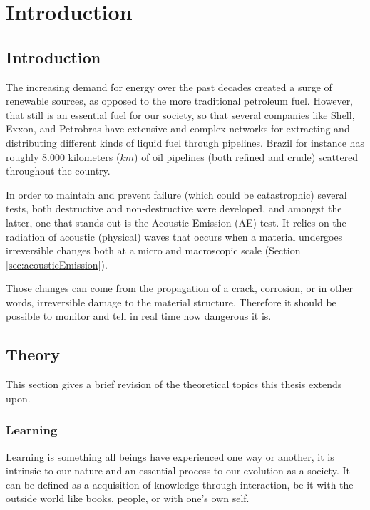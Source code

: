 \chapter{Introduction}

\section{Introduction}
The increasing demand for energy over the past decades created a surge of renewable sources, as opposed to the more traditional petroleum fuel. However, that still is an essential fuel for our society, so that several companies like Shell, Exxon, and Petrobras have extensive and complex networks for extracting and distributing different kinds of liquid fuel through pipelines. Brazil for instance has roughly $8.000$ kilometers ($km$) \cite{WorldFactbookCentral2016} of oil pipelines (both refined and crude) scattered throughout the country.

In order to maintain and prevent failure (which could be catastrophic) several tests, both destructive and non-destructive were developed, and amongst the latter, one that stands out is the Acoustic Emission (AE) test. It relies on the radiation of acoustic (physical) waves that occurs when a material undergoes irreversible changes both at a micro and macroscopic scale (Section \ref{sec:acousticEmission}). 

Those changes can come from the propagation of a crack, corrosion, or in other words, irreversible damage to the material structure. Therefore it should be possible to monitor and tell in real time how dangerous it is.

\section{Theory}

This section gives a brief revision of the theoretical topics this thesis extends upon. 

\subsection{Learning}

Learning is something all beings have experienced one way or another, it is intrinsic to our nature and an essential process to our evolution as a society. It can be defined as a acquisition of knowledge through interaction, be it with the outside world like books, people, or with one's own self.

